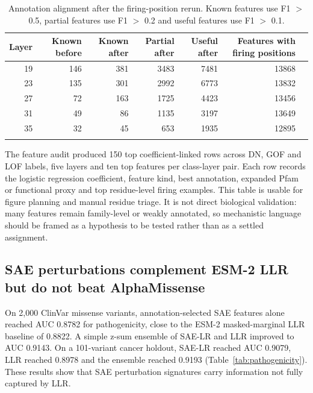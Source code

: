 \documentclass[pdflatex,sn-nature]{sn-jnl}
\begin{document}
\begin{table}[h]
\caption{Annotation alignment after the firing-position rerun. Known features use F1 $>$ 0.5, partial features use F1 $>$ 0.2 and useful features use F1 $>$ 0.1.}\label{tab:annotation}
\begin{tabular}{@{}rrrrrrr@{}}
\toprule
Layer & Known before & Known after & Partial after & Useful after & Features with firing positions \\
\midrule
19 & 146 & 381 & 3483 & 7481 & 13868 \\
23 & 135 & 301 & 2992 & 6773 & 13832 \\
27 & 72  & 163 & 1725 & 4423 & 13456 \\
31 & 49  & 86  & 1135 & 3197 & 13649 \\
35 & 32  & 45  & 653  & 1935 & 12895 \\
\botrule
\end{tabular}
\end{table}

The feature audit produced 150 top coefficient-linked rows across DN, GOF and LOF labels, five layers and ten top features per class-layer pair. Each row records the logistic regression coefficient, feature kind, best annotation, expanded Pfam or functional proxy and top residue-level firing examples. This table is usable for figure planning and manual residue triage. It is not direct biological validation: many features remain family-level or weakly annotated, so mechanistic language should be framed as a hypothesis to be tested rather than as a settled assignment.

\subsection{SAE perturbations complement ESM-2 LLR but do not beat AlphaMissense}

On 2,000 ClinVar missense variants, annotation-selected SAE features alone reached AUC 0.8782 for pathogenicity, close to the ESM-2 masked-marginal LLR baseline of 0.8822. A simple z-sum ensemble of SAE-LR and LLR improved to AUC 0.9143. On a 101-variant cancer holdout, SAE-LR reached AUC 0.9079, LLR reached 0.8978 and the ensemble reached 0.9193 (Table~\ref{tab:pathogenicity}). These results show that SAE perturbation signatures carry information not fully captured by LLR.
\end{document}
